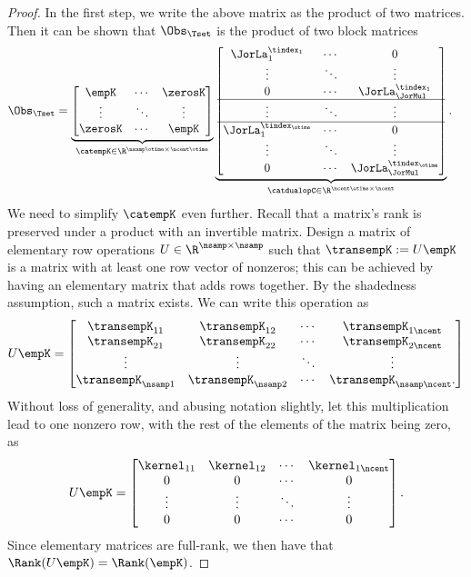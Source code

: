 \begin{proof}
 In the first step, we write the above matrix as the product of two matrices. 
 Then it can be 
 shown that $\Obs_{\Tset}$ is the product of two block matrices 
 \begin{align*}
 \Obs_{\Tset}  
 &=
 \underbrace{
 \begin{bmatrix}
  \empK   & \cdots & \zerosK\\
  \vdots  & \ddots & \vdots\\
  \zerosK  & \cdots & \empK
 \end{bmatrix}}_{\catempK\in\R^{\nsamp\otime\times\ncent\otime}}
 \underbrace{
 \begin{bmatrix}
  \JorLa_1^{\tindex_1} & \cdots & 0\\
   \vdots & \ddots & \vdots\\
  0 & \cdots & \JorLa_{\JorMul}^{\tindex_1}\\ 
   \hline
   \vdots & \ddots & \vdots\\
   \hline
  \JorLa_1^{\tindex_{\otime}} & \cdots & 0\\
   \vdots & \ddots & \vdots\\
  0 & \cdots & \JorLa_{\JorMul}^{\tindex_\otime}   
 \end{bmatrix}}_{\catdualopC\in\R^{\ncent\otime\times\ncent}}.
\end{align*}
We need to simplify $\catempK$ even further. 
Recall that a matrix's rank is preserved under a product with an invertible matrix. Design a 
matrix of elementary row operations $U\in\R^{\nsamp\times\nsamp}$ such that $\transempK := U\empK$ is a matrix with at least one row vector of nonzeros; this can be achieved by having an elementary matrix that adds rows together. By the shadedness assumption, such a matrix exists. We can write this operation as 
\begin{align*}
 U\empK = 
 \begin{bmatrix}
  \transempK_{11} & \transempK_{12} & \cdots & \transempK_{1\ncent}\\
  \transempK_{21} & \transempK_{22} & \cdots & \transempK_{2\ncent}\\
  \vdots & \vdots & \ddots & \vdots\\
  \transempK_{\nsamp1} & \transempK_{\nsamp2} & \cdots & \transempK_{\nsamp\ncent}.
 \end{bmatrix}
\end{align*}
Without loss of generality, and abusing notation slightly, let this multiplication lead to one nonzero row, with the rest of the elements of the matrix being zero, as 
\begin{align*}
 U\empK = 
 \begin{bmatrix}
  \kernel_{11} & \kernel_{12} & \cdots & \kernel_{1\ncent}\\
  0 & 0 & \cdots & 0\\
  \vdots & \vdots & \ddots & \vdots\\
  0 & 0 & \cdots & 0
 \end{bmatrix}.
\end{align*}
Since elementary matrices are full-rank, we then have that $\Rank(U\empK) = \Rank(\empK)$. 


\end{proof}
